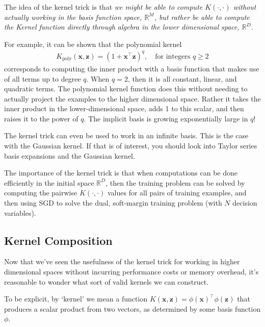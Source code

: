       The idea of the kernel trick is that {\em we might be able to compute $K(\cdot,\cdot)$ without actually working in the basis function space, $\mathbb{R}^M$, but rather be able to compute the Kernel function directly through algebra in the lower dimensional space, $\mathbb{R}^D$}.

        For example, it can be shown that the polynomial kernel
        \begin{align}
          K_{\mathrm{poly}}(\mathbf{x},\mathbf{z})=(1+\mathbf{x}^\top \mathbf{z})^q, \quad \mbox{for integers $q\geq 2$}
        \end{align}
        corresponds to computing the inner product with a basis function that makes use of all terms up to degree $q$. When $q=2$, then it is all constant, linear, and quadratic terms. The polynomial kernel function does this without needing to actually project the examples to the higher dimensional space. Rather it takes the inner product in the lower-dimensional space, adds 1 to this scalar, and then raises it to the power of $q$. The implicit basis is growing exponentially large in $q$! 
        
   
\begin{warning}
    The kernel trick can even be used to work in an infinite basis. This is the case with the Gaussian kernel. If that is of interest, you should look into Taylor series basis expansions and the Gaussian kernel.
\end{warning}

The importance of the kernel trick is that when computations can be done efficiently in the initial space $\mathbb{R}^D$, then the training problem can be solved by computing the pairwise $K(\cdot,\cdot)$ values for all pairs of training examples, and then using SGD to solve the dual, soft-margin training problem (with $N$ decision variables).


\subsection{Kernel Composition}

Now that we've seen the usefulness of the kernel trick for working in higher dimensional spaces without incurring performance costs or memory overhead, it's reasonable to wonder what sort of valid kernels we can construct.

To be explicit, by `kernel' we mean a function $K(\textbf{x}, \textbf{z}) = \phi(\textbf{x})^\top \phi(\textbf{z})$ that produces a scalar product from two vectors, as determined by some basis function $\phi$.

